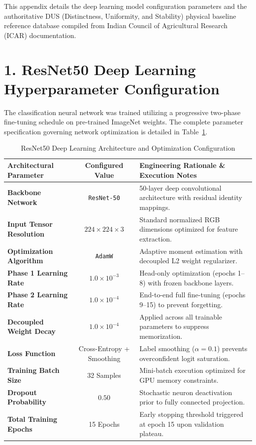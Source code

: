 This appendix details the deep learning model configuration parameters and the authoritative DUS (Distinctness, Uniformity, and Stability) physical baseline reference database compiled from Indian Council of Agricultural Research (ICAR) documentation.

\section*{1. ResNet50 Deep Learning Hyperparameter Configuration}

The classification neural network was trained utilizing a progressive two-phase fine-tuning schedule on pre-trained ImageNet weights. The complete parameter specification governing network optimization is detailed in Table~\ref{tab:app-modelconfig}.

\begin{table}[htbp]
  \centering
  \caption{ResNet50 Deep Learning Architecture and Optimization Configuration}
  \label{tab:app-modelconfig}
  \renewcommand{\arraystretch}{1.35}
  \begin{tabularx}{\textwidth}{@{} l c X @{}}
    \toprule
    \textbf{Architectural Parameter} & \textbf{Configured Value} & \textbf{Engineering Rationale \& Execution Notes} \\
    \midrule
    \textbf{Backbone Network} & \texttt{ResNet-50} & 50-layer deep convolutional architecture with residual identity mappings. \\
    \addlinespace
    \textbf{Input Tensor Resolution} & $224 \times 224 \times 3$ & Standard normalized RGB dimensions optimized for feature extraction. \\
    \addlinespace
    \textbf{Optimization Algorithm} & \texttt{AdamW} & Adaptive moment estimation with decoupled L2 weight regularizer. \\
    \addlinespace
    \textbf{Phase 1 Learning Rate} & $1.0 \times 10^{-3}$ & Head-only optimization (epochs 1--8) with frozen backbone layers. \\
    \addlinespace
    \textbf{Phase 2 Learning Rate} & $1.0 \times 10^{-4}$ & End-to-end full fine-tuning (epochs 9--15) to prevent forgetting. \\
    \addlinespace
    \textbf{Decoupled Weight Decay} & $1.0 \times 10^{-4}$ & Applied across all trainable parameters to suppress memorization. \\
    \addlinespace
    \textbf{Loss Function} & Cross-Entropy + Smoothing & Label smoothing ($\alpha = 0.1$) prevents overconfident logit saturation. \\
    \addlinespace
    \textbf{Training Batch Size} & 32 Samples & Mini-batch execution optimized for GPU memory constraints. \\
    \addlinespace
    \textbf{Dropout Probability} & $0.50$ & Stochastic neuron deactivation prior to fully connected projection. \\
    \addlinespace
    \textbf{Total Training Epochs} & 15 Epochs & Early stopping threshold triggered at epoch 15 upon validation plateau. \\
    \bottomrule
  \end{tabularx}
\end{table}

